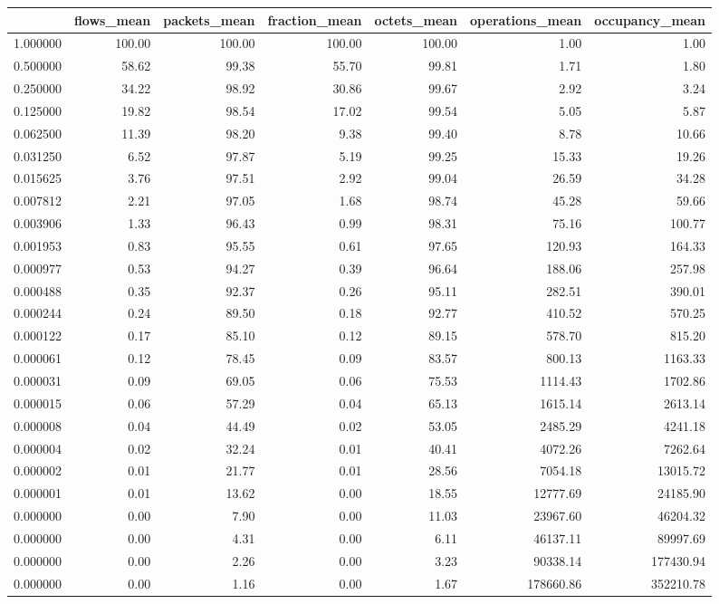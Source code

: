 \begin{tabular}{lrrrrrr}
\toprule
 & flows_mean & packets_mean & fraction_mean & octets_mean & operations_mean & occupancy_mean \\
\midrule
1.000000 & 100.00 & 100.00 & 100.00 & 100.00 & 1.00 & 1.00 \\
0.500000 & 58.62 & 99.38 & 55.70 & 99.81 & 1.71 & 1.80 \\
0.250000 & 34.22 & 98.92 & 30.86 & 99.67 & 2.92 & 3.24 \\
0.125000 & 19.82 & 98.54 & 17.02 & 99.54 & 5.05 & 5.87 \\
0.062500 & 11.39 & 98.20 & 9.38 & 99.40 & 8.78 & 10.66 \\
0.031250 & 6.52 & 97.87 & 5.19 & 99.25 & 15.33 & 19.26 \\
0.015625 & 3.76 & 97.51 & 2.92 & 99.04 & 26.59 & 34.28 \\
0.007812 & 2.21 & 97.05 & 1.68 & 98.74 & 45.28 & 59.66 \\
0.003906 & 1.33 & 96.43 & 0.99 & 98.31 & 75.16 & 100.77 \\
0.001953 & 0.83 & 95.55 & 0.61 & 97.65 & 120.93 & 164.33 \\
0.000977 & 0.53 & 94.27 & 0.39 & 96.64 & 188.06 & 257.98 \\
0.000488 & 0.35 & 92.37 & 0.26 & 95.11 & 282.51 & 390.01 \\
0.000244 & 0.24 & 89.50 & 0.18 & 92.77 & 410.52 & 570.25 \\
0.000122 & 0.17 & 85.10 & 0.12 & 89.15 & 578.70 & 815.20 \\
0.000061 & 0.12 & 78.45 & 0.09 & 83.57 & 800.13 & 1163.33 \\
0.000031 & 0.09 & 69.05 & 0.06 & 75.53 & 1114.43 & 1702.86 \\
0.000015 & 0.06 & 57.29 & 0.04 & 65.13 & 1615.14 & 2613.14 \\
0.000008 & 0.04 & 44.49 & 0.02 & 53.05 & 2485.29 & 4241.18 \\
0.000004 & 0.02 & 32.24 & 0.01 & 40.41 & 4072.26 & 7262.64 \\
0.000002 & 0.01 & 21.77 & 0.01 & 28.56 & 7054.18 & 13015.72 \\
0.000001 & 0.01 & 13.62 & 0.00 & 18.55 & 12777.69 & 24185.90 \\
0.000000 & 0.00 & 7.90 & 0.00 & 11.03 & 23967.60 & 46204.32 \\
0.000000 & 0.00 & 4.31 & 0.00 & 6.11 & 46137.11 & 89997.69 \\
0.000000 & 0.00 & 2.26 & 0.00 & 3.23 & 90338.14 & 177430.94 \\
0.000000 & 0.00 & 1.16 & 0.00 & 1.67 & 178660.86 & 352210.78 \\
\bottomrule
\end{tabular}
